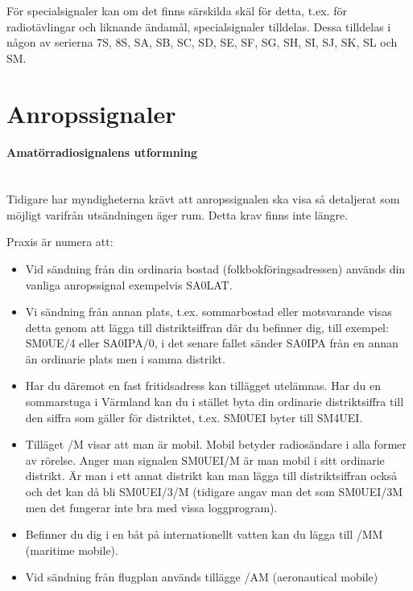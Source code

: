 För specialsignaler kan om det finns särskilda skäl för detta, t.ex.
för radiotävlingar och liknande ändamål, specialsignaler tilldelas.
Dessa tilldelas i någon av serierna 7S, 8S, SA, SB, SC, SD, SE, SF,
SG, SH, SI, SJ, SK, SL och SM.

\section{Anropssignaler}

\paragraph{Amatörradiosignalens utformning} \hfill \\

Tidigare har myndigheterna krävt att anropssignalen ska visa så
detaljerat som möjligt varifrån utsändningen äger rum. Detta krav
finns inte längre.

Praxis är numera att:

\begin{itemize}
\item Vid sändning från din ordinaria bostad
  (folkbokföringsadressen) används din vanliga anropssignal
  exempelvis SA0LAT.
\item Vi sändning från annan plats, t.ex. sommarbostad eller
  motsvarande visas detta genom att lägga till distriktsiffran där
  du befinner dig, till exempel: SM0UE/4 eller SA0IPA/0, i det
  senare fallet sänder SA0IPA från en annan än ordinarie plats men
  i samma distrikt.
\item Har du däremot en fast fritidsadress kan tillägget
  utelämnas. Har du en sommarstuga i Värmland kan du i stället
  byta din ordinarie distriktsiffra till den siffra som gäller
  för distriktet, t.ex. SM0UEI byter till SM4UEI.
\item Tilläget /M visar att man är mobil. Mobil betyder
  radiosändare i alla former av rörelse. Anger man signalen
  SM0UEI/M är man mobil i sitt ordinarie distrikt. Är man i
  ett annat distrikt kan man lägga till distriktsiffran också
  och det kan då bli SM0UEI/3/M (tidigare angav man det som
  SM0UEI/3M men det fungerar inte bra med vissa loggprogram).
  
\item Befinner du dig i en båt på internationellt vatten kan
  du lägga till /MM (maritime mobile).
\item Vid sändning från flugplan används tillägge /AM
  (aeronautical mobile)
\end{itemize}

